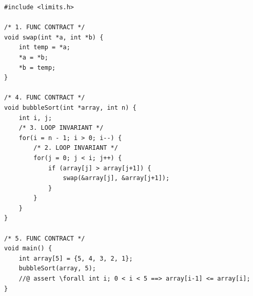 \documentclass[varwidth=12.85cm]{standalone}
\begin{document}
\begin{verbatim}
#include <limits.h>

/* 1. FUNC CONTRACT */
void swap(int *a, int *b) {
    int temp = *a;
    *a = *b;
    *b = temp;
}

/* 4. FUNC CONTRACT */
void bubbleSort(int *array, int n) {
    int i, j;
    /* 3. LOOP INVARIANT */
    for(i = n - 1; i > 0; i--) {
        /* 2. LOOP INVARIANT */
        for(j = 0; j < i; j++) {
            if (array[j] > array[j+1]) {
                swap(&array[j], &array[j+1]);
            }
        }
    }
}

/* 5. FUNC CONTRACT */
void main() {
    int array[5] = {5, 4, 3, 2, 1};
    bubbleSort(array, 5);
    //@ assert \forall int i; 0 < i < 5 ==> array[i-1] <= array[i];
}
\end{verbatim}
\end{document}
